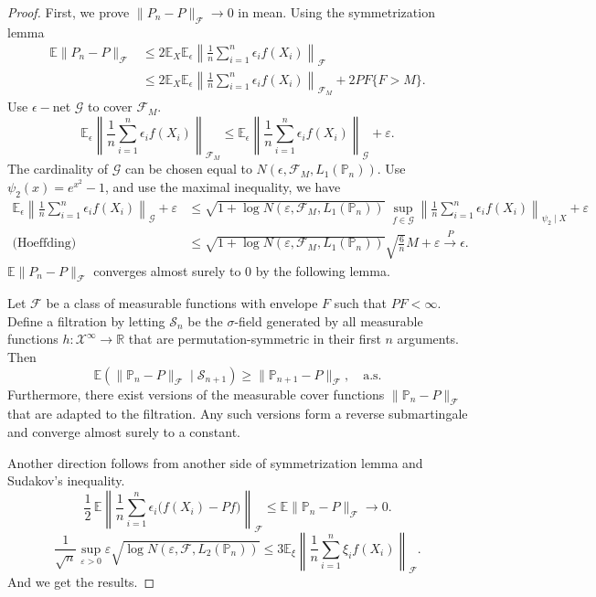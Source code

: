 \begin{proof}
    First, we prove $\|P_n - P\|_{\mathcal{F}}\to 0$ in mean. Using the symmetrization lemma
    \begin{align*}
    \mathbb{E} \|P_n - P\|_{\mathcal{F}}
    &\le 2 \mathbb{E}_X \mathbb{E}_\epsilon \left\| \frac{1}{n} \sum_{i=1}^n \epsilon_i f(X_i) \right\|_{\mathcal{F}} \\
    &\le 2 \mathbb{E}_X \mathbb{E}_\epsilon \left\| \frac{1}{n} \sum_{i=1}^n \epsilon_i f(X_i) \right\|_{\mathcal{F}_M}
    + 2 P F\{F > M\}.
    \end{align*}
    Use $\epsilon-$net $\mathcal{G}$ to cover $\mathcal{F}_M$.
    \[
    \mathbb{E}_\epsilon \left\| \frac{1}{n} \sum_{i=1}^n \epsilon_i f(X_i) \right\|_{\mathcal{F}_M}
    \le
    \mathbb{E}_\epsilon \left\| \frac{1}{n} \sum_{i=1}^n \epsilon_i f(X_i) \right\|_{\mathcal{G}}
    + \varepsilon.
    \]
    The cardinality of $\mathcal{G}$ can be chosen equal to $N(\epsilon, \mathcal{F}_M, L_1(\mathbb{P}_n))$.
    Use $\psi_2(x)=e^{x^2}-1$, and use the maximal inequality, we have
    \begin{align*}
    \mathbb{E}_\epsilon \left\| \frac{1}{n} \sum_{i=1}^n \epsilon_i f(X_i) \right\|_{\mathcal{G}}
    + \varepsilon 
    &\le \sqrt{1 + \log N(\varepsilon, \mathcal{F}_M, L_1(\mathbb{P}_n))}
    \;\sup_{f \in \mathcal{G}}
    \left\| \frac{1}{n} \sum_{i=1}^n \epsilon_i f(X_i) \right\|_{\psi_2 \mid X}
    + \varepsilon \\
    \text{(Hoeffding)} &\le \sqrt{1 + \log N(\varepsilon, \mathcal{F}_M, L_1(\mathbb{P}_n))}
    \sqrt{\frac{6}{n}} M
    + \varepsilon \xrightarrow{P} \epsilon.
    \end{align*}
    $\mathbb{E} \|P_n - P\|_{\mathcal{F}}$ converges almost surely to $0$ by the following lemma. 
    \begin{lem}
    Let $\mathcal{F}$ be a class of measurable functions with envelope $F$ such that
    $P F < \infty$. Define a filtration by letting $\mathcal{S}_n$ be the
    $\sigma$-field generated by all measurable functions
    $h : \mathcal{X}^\infty \to \mathbb{R}$ that are permutation-symmetric in their
    first $n$ arguments. Then
    \[
    \mathbb{E}\!\left( \| \mathbb{P}_n - P \|_{\mathcal{F}} \mid \mathcal{S}_{n+1} \right)
    \ge \| \mathbb{P}_{n+1} - P \|_{\mathcal{F}}, \quad \text{a.s.}
    \]
    Furthermore, there exist versions of the measurable cover functions
    $\| \mathbb{P}_n - P \|_{\mathcal{F}}$ that are adapted to the filtration.
    Any such versions form a reverse submartingale and converge almost surely to a constant.
    \end{lem}
    Another direction follows from another side of symmetrization lemma and Sudakov's inequality.
    \[
    \frac{1}{2}\,\mathbb{E} \left\| \frac{1}{n} \sum_{i=1}^n \epsilon_i \bigl(f(X_i) - P f\bigr) \right\|_{\mathcal{F}}
    \le
    \mathbb{E} \| \mathbb{P}_n - P \|_{\mathcal{F}}
    \to 0.
    \]
    \[
    \frac{1}{\sqrt{n}} \sup_{\varepsilon > 0}
    \varepsilon \sqrt{\log N\!\left(\varepsilon, \mathcal{F}, L_2(\mathbb{P}_n)\right)}
    \le
    3 \mathbb{E}_\xi \left\| \frac{1}{n} \sum_{i=1}^n \xi_i f(X_i) \right\|_{\mathcal{F}}.
    \]
    And we get the results.
\end{proof}

